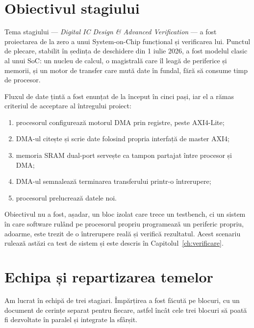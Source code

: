 \documentclass[11pt,openany]{report}
\begin{document}
\section{Obiectivul stagiului}

Tema stagiului --- \emph{Digital IC Design \& Advanced Verification} --- a fost
proiectarea de la zero a unui System-on-Chip funcțional și verificarea lui.
Punctul de plecare, stabilit în ședința de deschidere din 1 iulie 2026, a fost
modelul clasic al unui SoC: un nucleu de calcul, o magistrală care îl leagă de
periferice și memorii, și un motor de transfer care mută date în fundal, fără să
consume timp de procesor.

Fluxul de date țintă a fost enunțat de la început în cinci pași, iar el a rămas
criteriul de acceptare al întregului proiect:

\begin{enumerate}[itemsep=1pt,topsep=3pt]
\item procesorul configurează motorul DMA prin registre, peste AXI4-Lite;
\item DMA-ul citește și scrie date folosind propria interfață de master AXI4;
\item memoria SRAM dual-port servește ca tampon partajat între procesor și DMA;
\item DMA-ul semnalează terminarea transferului printr-o întrerupere;
\item procesorul prelucrează datele noi.
\end{enumerate}

Obiectivul nu a fost, așadar, un bloc izolat care trece un testbench, ci un
sistem în care software rulând pe procesorul propriu programează un periferic
propriu, adoarme, este trezit de o întrerupere reală și verifică rezultatul.
Acest scenariu rulează astăzi ca test de sistem și este descris în
Capitolul~\ref{ch:verificare}.

\section{Echipa și repartizarea temelor}
\label{sec:echipa}

Am lucrat în echipă de trei stagiari. Împărțirea a fost făcută pe blocuri, cu un
document de cerințe separat pentru fiecare, astfel încât cele trei blocuri să
poată fi dezvoltate în paralel și integrate la sfârșit.
\end{document}
